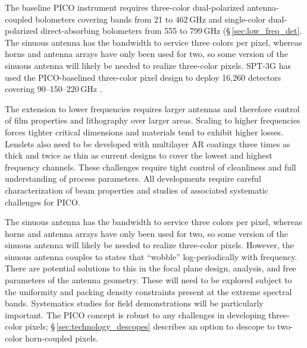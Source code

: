 The baseline PICO instrument requires three-color dual-polarized
antenna-coupled bolometers covering bands from 21 to 462\,GHz and
single-color dual-polarized direct-absorbing bolometers from 555 to
799\,GHz (\S\,\ref{sec:low_freq_det}.  The sinuous antenna has the
bandwidth to service three colors per pixel, whereas horns and antenna
arrays have only been used for two, so some version of the sinuous
antenna will likely be needed to realize three-color pixels.  SPT-3G
has used the PICO-baselined three-color pixel design to deploy 16,260
detectors covering 90--150--220\,GHz \citep{Dutcher2018}.

The extension to lower frequencies requires larger antennas and
therefore control of film properties and lithography over larger
areas. Scaling to higher frequencies forces tighter critical
dimensions and materials tend to exhibit higher losses. Lenslets also
need to be developed with multilayer AR coatings three times as thick
and twice as thin as current designs to cover the lowest and highest
frequency channels. These challenges require tight control of
cleanliness and full understanding of process parameters. All
developments require careful characterization of beam properties and
studies of associated systematic challenges for PICO.

The sinuous antenna has the bandwidth to service three colors per
pixel, whereas horns and antenna arrays have only been used for two,
so some version of the sinuous antenna will likely be needed to
realize three-color pixels. However, the sinuous antenna couples to
states that ``wobble'' log-periodically with frequency. There are
potential solutions to this in the focal plane design, analysis, and
free parameters of the antenna geometry. These will need to be
explored subject to the uniformity and packing density constraints
present at the extreme spectral bands.  Systematics studies for field
demonstrations will be particularly important. The PICO concept is
robust to any challenges in developing three-color pixels;
\S\,\ref{sec:technology_descopes} describes an option to descope to
two-color horn-coupled pixels.

